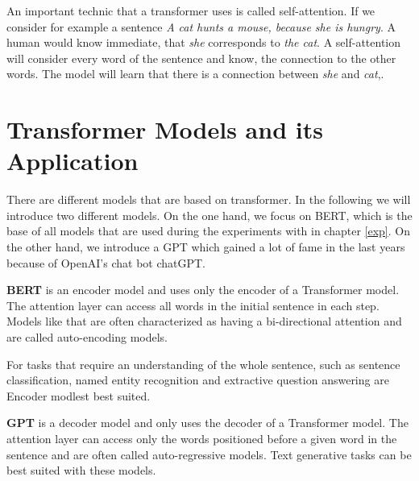 An important technic that a transformer uses is called self-attention.
If we consider for example a sentence \textit{A cat hunts a mouse, because she is hungry}.
A human would know immediate, that \textit{she} corresponds to \textit{the cat}. 
A self-attention will consider every word of the sentence and know, the connection to the other words.
The model will learn that there is a connection between \textit{she} and \textit{cat},. 


\section{Transformer Models and its Application}
There are different models that are based on transformer. 
In the following we will introduce two different models.
On the one hand, we focus on {BERT}, which is the base of all models that are used during the experiments with in chapter \ref{exp}.
On the other hand, we introduce a \ac{GPT} which gained a lot of fame in the last years because of OpenAI's chat bot chatGPT.

\textbf{BERT} is an encoder model and uses only the encoder of a Transformer model. 
The attention layer can access all words in the initial sentence in each step.
Models like that are often characterized as having a bi-directional attention and are called auto-encoding models.

For tasks that require an understanding of the whole sentence, such as sentence classification, named entity recognition and extractive question answering are Encoder modlest best suited.

\textbf{GPT} is a decoder model and only uses the decoder of a Transformer model.
The attention layer can access only the words positioned before a given word in the sentence and are often called auto-regressive models.
Text generative tasks can be best suited with these models. 


